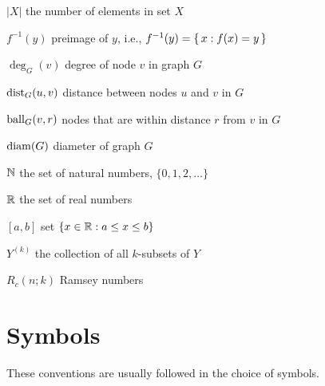 {\raggedright
\begin{notation}
    \item[$|X|$] the number of elements in set $X$
    \item[$f^{-1}(y)$] preimage of $y$, i.e., $f^{-1}(y) = \{\,  x : f(x) = y  \,\}$
    \item[$\deg_G(v)$] degree of node $v$ in graph $G$
    \item[$\operatorname{dist}_G(u,v)$] distance between nodes $u$ and $v$ in $G$
    \item[$\operatorname{ball}_G(v,r)$] nodes that are within distance $r$ from $v$ in $G$
    \item[$\operatorname{diam}(G)$] diameter of graph $G$
    \item[$\mathbb{N}$] the set of natural numbers, $\{0,1,2,\dotsc\}$
    \item[$\mathbb{R}$] the set of real numbers
    \item[{$[a,b]$}] set $\{x \in \mathbb{R} : a \le x \le b\}$
    \item[$Y^{(k)}$] the collection of all $k$-subsets of $Y$
    \item[$R_c(n;k)$] Ramsey numbers
\end{notation}}

\section*{Symbols}

These conventions are usually followed in the choice of symbols.

